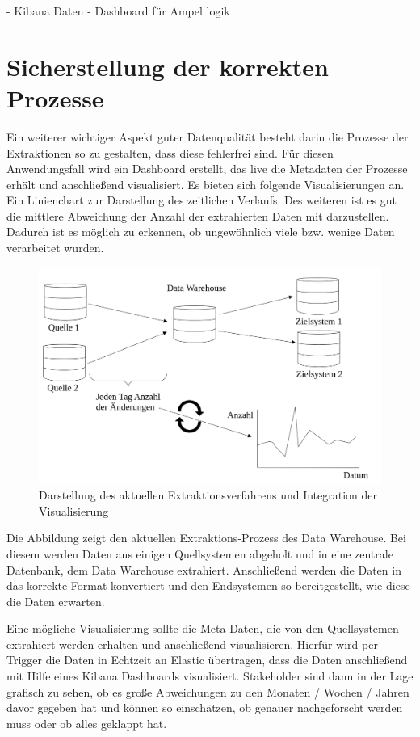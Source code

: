 - Kibana Daten
- Dashboard für Ampel logik

\section{Sicherstellung der korrekten Prozesse}
Ein weiterer wichtiger Aspekt guter Datenqualität besteht darin die Prozesse der Extraktionen so zu gestalten, dass diese fehlerfrei sind.
Für diesen Anwendungsfall wird ein Dashboard erstellt, das live die Metadaten der Prozesse erhält und anschließend visualisiert.
Es bieten sich folgende Visualisierungen an.
Ein Linienchart zur Darstellung des zeitlichen Verlaufs.
Des weiteren ist es gut die mittlere Abweichung der Anzahl der extrahierten Daten mit darzustellen. 
Dadurch ist es möglich zu erkennen, ob ungewöhnlich viele bzw. wenige Daten verarbeitet wurden. 


\begin{figure}[h]
\centering
\includegraphics[width=150mm,scale=1]{content/Darstellung_vis_pipeline.png}
\caption{Darstellung des aktuellen Extraktionsverfahrens und Integration der Visualisierung }%
\end{figure}
Die Abbildung zeigt den aktuellen Extraktions-Prozess des Data Warehouse. 
Bei diesem werden Daten aus einigen Quellsystemen abgeholt und in eine zentrale Datenbank, dem Data Warehouse extrahiert.
Anschließend werden die Daten in das korrekte Format konvertiert und den Endsystemen so bereitgestellt, wie diese die Daten erwarten.

Eine mögliche Visualisierung sollte die Meta-Daten, die von den Quellsystemen extrahiert werden erhalten und anschließend visualisieren.
Hierfür wird per Trigger die Daten in Echtzeit an Elastic übertragen, dass die Daten anschließend mit Hilfe eines Kibana Dashboards visualisiert.
Stakeholder sind dann in der Lage grafisch zu sehen, ob es große Abweichungen zu den Monaten / Wochen / Jahren davor gegeben hat und können so einschätzen, ob genauer nachgeforscht werden muss oder ob alles geklappt hat.

